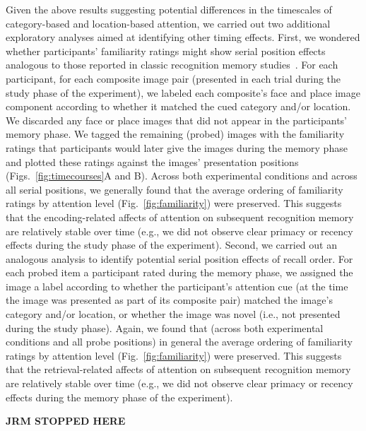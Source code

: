 \documentclass[english]{article}
\begin{document}
Given the above results suggesting potential differences in the timescales of
category-based and location-based attention, we carried out two additional
exploratory analyses aimed at identifying other timing effects. First, we
wondered whether participants' familiarity ratings might show serial position
effects analogous to those reported in classic recognition memory
studies~\citep[e.g.,][]{Neat93b, McElDosh89, WickNorm66}. For each participant,
for each composite image pair (presented in each trial during the study phase
of the experiment), we labeled each composite's face and place image component
according to whether it matched the cued category and/or location. We discarded
any face or place images that did not appear in the participants' memory phase.
We tagged the remaining (probed) images with the familiarity ratings that
participants would later give the images during the memory phase and plotted
these ratings against the images' presentation positions
(Figs.~\ref{fig:timecourses}A and B). Across both experimental conditions and
across all serial positions, we generally found that the average ordering of
familiarity ratings by attention level (Fig.~\ref{fig:familiarity}) were
preserved. This suggests that the encoding-related affects of attention on
subsequent recognition memory are relatively stable over time (e.g., we did not
observe clear primacy or recency effects during the study phase of the
experiment). Second, we carried out an analogous analysis to identify potential
serial position effects of recall order. For each probed item a participant
rated during the memory phase, we assigned the image a label according to
whether the participant's attention cue (at the time the image was presented as
part of its composite pair) matched the image's category and/or location, or
whether the image was novel (i.e., not presented during the study phase).
Again, we found that (across both experimental conditions and all probe
positions) in general the average ordering of familiarity ratings by attention
level (Fig.~\ref{fig:familiarity}) were preserved. This suggests that the
retrieval-related affects of attention on subsequent recognition memory are
relatively stable over time (e.g., we did not observe clear primacy or recency
effects during the memory phase of the experiment).

\textbf{JRM STOPPED HERE}
\end{document}
